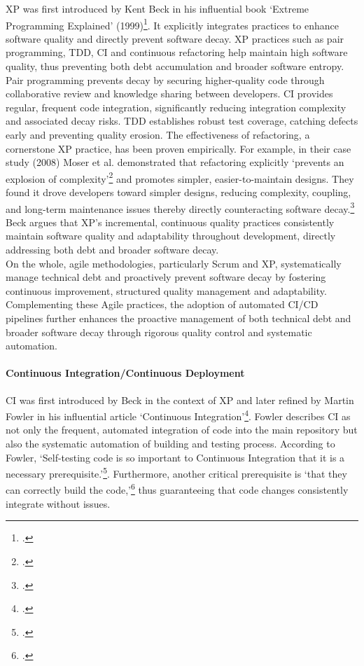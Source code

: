 \ac{XP} was first introduced by Kent Beck in his influential book `Extreme Programming Explained' (1999)\footcite{beckExtremeProgrammingExplained1999}.
It explicitly integrates practices to enhance software quality and directly prevent software decay.
\ac{XP} practices such as pair programming, \ac{TDD}, \ac{CI} and continuous refactoring help maintain high software quality, thus preventing both debt accumulation
and broader software entropy.
Pair programming prevents decay by securing higher-quality code through collaborative review and knowledge sharing between developers.
\ac{CI} provides regular, frequent code integration, significantly reducing integration complexity and associated decay risks.
\ac{TDD} establishes robust test coverage, catching defects early and preventing quality erosion.
The effectiveness of refactoring, a cornerstone XP practice, has been proven empirically. For example, in their case study (2008) Moser et al.
demonstrated that refactoring explicitly `prevents an explosion of complexity'\footcite[262]{moserCaseStudyImpact2008}
and promotes simpler, easier-to-maintain designs.
They found it drove developers toward simpler designs, reducing complexity, coupling, and long-term maintenance issues thereby directly counteracting software decay.\footcite[262]{moserCaseStudyImpact2008}
Beck argues that \ac{XP}'s incremental, continuous quality practices consistently maintain software quality and adaptability throughout development, directly addressing both debt and broader software decay.\\
On the whole, agile methodologies, particularly Scrum and \ac{XP}, systematically manage technical debt and proactively prevent software decay by fostering continuous improvement, structured quality management and adaptability.
Complementing these Agile practices, the adoption of automated \ac{CI/CD} pipelines further enhances the proactive management of both technical debt
and broader software decay through rigorous quality control and systematic automation.\\

\paragraph{Continuous Integration/Continuous Deployment}
\ac{CI} was first introduced by Beck in the context of \ac{XP} and later refined by Martin Fowler in his influential article `Continuous Integration'\footcite{fowlerContinuousIntegration2006}.
Fowler describes \ac{CI} as not only the frequent, automated integration of code into the main repository but also the systematic automation of building and testing process.
According to Fowler, `Self-testing code is so important to Continuous Integration that it is a necessary prerequisite.'\footcite{fowlerContinuousIntegration2006}.
Furthermore, another critical prerequisite is `that they can correctly build the code,'\footcite{fowlerContinuousIntegration2006} thus guaranteeing that code changes consistently
integrate without issues.\\

